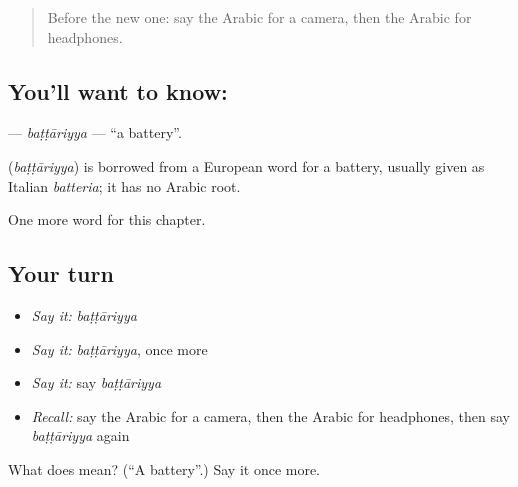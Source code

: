 \label{lesson:AR-C217-battariyya}



\begin{quote}
Before the new one: say the Arabic for a camera, then the Arabic for headphones.
\end{quote}

\subsection*{You'll want to know: }
\textbf{} — \emph{baṭṭāriyya} — \textquotedblleft{}a battery\textquotedblright{}.

\begin{cousinweb}
\textbf{} (\emph{baṭṭāriyya}) is borrowed from a European word for a battery, usually given as Italian \emph{batteria}; it has no Arabic root.
\end{cousinweb}

\begin{grammarlens}[title={What you've built}]
One more word for this chapter.
\end{grammarlens}

\subsection*{Your turn}
\begin{itemize}
\raggedright
  \item \emph{Say it:} \emph{baṭṭāriyya}
  \item \emph{Say it:} \emph{baṭṭāriyya}, once more
  \item \emph{Say it:} say \emph{baṭṭāriyya}
  \item \emph{Recall:} say the Arabic for a camera, then the Arabic for headphones, then say \emph{baṭṭāriyya} again
\end{itemize}

\begin{tcolorbox}[breakable,colback=teal!4,colframe=teal!35!black,title={Before you move on}]
What does  mean? (\textquotedblleft{}A battery\textquotedblright{}.) Say it once more.
\end{tcolorbox}
